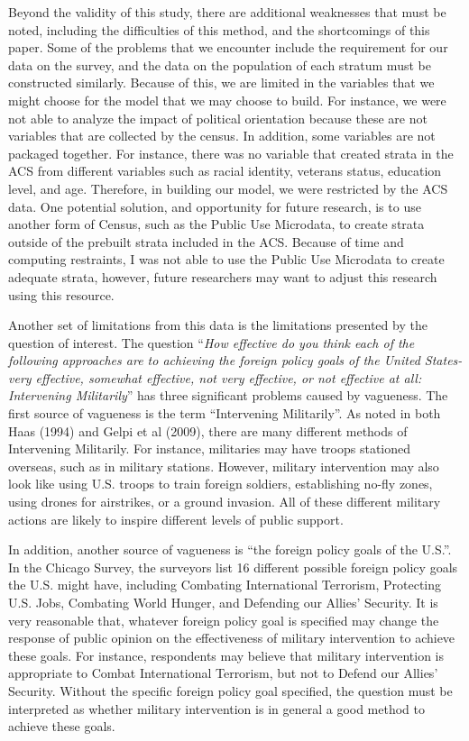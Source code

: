 \documentclass[
  11pt,
]{article}
\begin{document}
Beyond the validity of this study, there are additional weaknesses that
must be noted, including the difficulties of this method, and the
shortcomings of this paper. Some of the problems that we encounter
include the requirement for our data on the survey, and the data on the
population of each stratum must be constructed similarly. Because of
this, we are limited in the variables that we might choose for the model
that we may choose to build. For instance, we were not able to analyze
the impact of political orientation because these are not variables that
are collected by the census. In addition, some variables are not
packaged together. For instance, there was no variable that created
strata in the ACS from different variables such as racial identity,
veterans status, education level, and age. Therefore, in building our
model, we were restricted by the ACS data. One potential solution, and
opportunity for future research, is to use another form of Census, such
as the Public Use Microdata, to create strata outside of the prebuilt
strata included in the ACS. Because of time and computing restraints, I
was not able to use the Public Use Microdata to create adequate strata,
however, future researchers may want to adjust this research using this
resource.

Another set of limitations from this data is the limitations presented
by the question of interest. The question ``\emph{How effective do you
think each of the following approaches are to achieving the foreign
policy goals of the United States- very effective, somewhat effective,
not very effective, or not effective at all: Intervening Militarily}''
has three significant problems caused by vagueness. The first source of
vagueness is the term ``Intervening Militarily''. As noted in both Haas
(1994) and Gelpi et al (2009), there are many different methods of
Intervening Militarily. For instance, militaries may have troops
stationed overseas, such as in military stations. However, military
intervention may also look like using U.S. troops to train foreign
soldiers, establishing no-fly zones, using drones for airstrikes, or a
ground invasion. All of these different military actions are likely to
inspire different levels of public support.

In addition, another source of vagueness is ``the foreign policy goals
of the U.S.''. In the Chicago Survey, the surveyors list 16 different
possible foreign policy goals the U.S. might have, including Combating
International Terrorism, Protecting U.S. Jobs, Combating World Hunger,
and Defending our Allies' Security. It is very reasonable that, whatever
foreign policy goal is specified may change the response of public
opinion on the effectiveness of military intervention to achieve these
goals. For instance, respondents may believe that military intervention
is appropriate to Combat International Terrorism, but not to Defend our
Allies' Security. Without the specific foreign policy goal specified,
the question must be interpreted as whether military intervention is in
general a good method to achieve these goals.
\end{document}
